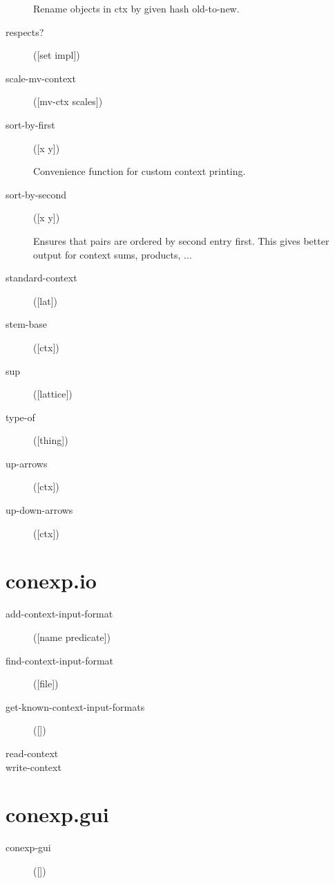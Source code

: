 \begin{description}
Rename objects in ctx by given hash old-to-new.

  \item[respects?]
([set impl])



  \item[scale-mv-context]
([mv-ctx scales])



  \item[sort-by-first]
([x y])

Convenience function for custom context printing.

  \item[sort-by-second]
([x y])

Ensures that pairs are ordered by second entry first. This gives
  better output for context sums, products, ...

  \item[standard-context]
([lat])



  \item[stem-base]
([ctx])



  \item[sup]
([lattice])



  \item[type-of]
([thing])



  \item[up-arrows]
([ctx])



  \item[up-down-arrows]
([ctx])



\end{description}

\section{conexp.io}
\begin{description}
  \item[add-context-input-format]
([name predicate])



  \item[find-context-input-format]
([file])



  \item[get-known-context-input-formats]
([])



  \item[read-context]




  \item[write-context]




\end{description}

\section{conexp.gui}
\begin{description}
  \item[conexp-gui]
([])



\end{description}


